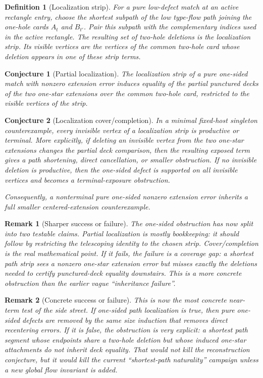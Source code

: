 \documentclass[11pt]{article}
\newtheorem{conjecture}{Conjecture}
\newtheorem{definition}{Definition}
\newtheorem{remark}{Remark}
\begin{document}
\begin{definition}[Localization strip]
For a pure low-defect match at an active rectangle entry, choose the shortest
subpath of the low type-flow path joining the one-hole cards \(A_t\) and
\(B_{t'}\).  Pair this subpath with the complementary indices used in the
active rectangle.  The resulting set of two-hole deletions is the localization
strip.  Its visible vertices are the vertices of the common two-hole card
whose deletion appears in one of these strip terms.
\end{definition}

\begin{conjecture}[Partial localization]
The localization strip of a pure one-sided match with nonzero extension error
induces equality of the partial punctured decks of the two one-star extensions
over the common two-hole card, restricted to the visible vertices of the
strip.
\end{conjecture}

\begin{conjecture}[Localization cover/completion]
In a minimal fixed-host singleton counterexample, every invisible vertex of a
localization strip is productive or terminal.  More explicitly, if deleting an
invisible vertex from the two one-star extensions changes the partial deck
comparison, then the resulting exposed term gives a path shortening, direct
cancellation, or smaller obstruction.  If no invisible deletion is productive,
then the one-sided defect is supported on all invisible vertices and becomes a
terminal-exposure obstruction.

Consequently, a nonterminal pure one-sided nonzero extension error inherits a
full smaller centered-extension counterexample.
\end{conjecture}

\begin{remark}[Sharper success or failure]
The one-sided obstruction has now split into two testable claims.  Partial
localization is mostly bookkeeping: it should follow by restricting the
telescoping identity to the chosen strip.  Cover/completion is the real
mathematical point.  If it fails, the failure is a \emph{coverage gap}: a
shortest path strip sees a nonzero one-star extension error but misses exactly
the deletions needed to certify punctured-deck equality downstairs.  This is a
more concrete obstruction than the earlier vague ``inheritance failure''.
\end{remark}

\begin{remark}[Concrete success or failure]
This is now the most concrete near-term test of the side street.  If
one-sided path localization is true, then pure one-sided defects are removed
by the same size induction that removes direct recentering errors.  If it is
false, the obstruction is very explicit: a shortest path segment whose
endpoints share a two-hole deletion but whose induced one-star attachments do
not inherit deck equality.  That would not kill the reconstruction conjecture,
but it would kill the current ``shortest-path naturality'' campaign unless a
new global flow invariant is added.
\end{remark}
\end{document}
